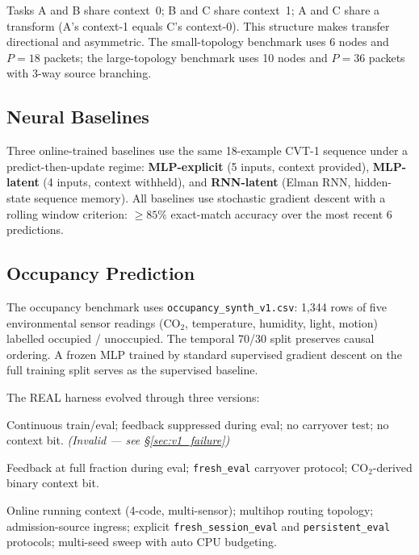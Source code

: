 \documentclass[10pt,twocolumn]{article}
\begin{document}
Tasks A and B share context~0; B and C share context~1; A and C share a
transform (A's context-1 equals C's context-0).
This structure makes transfer directional and asymmetric.
The small-topology benchmark uses 6 nodes and $P=18$ packets;
the large-topology benchmark uses 10 nodes and $P=36$ packets
with 3-way source branching.

\subsection{Neural Baselines}

Three online-trained baselines use the same 18-example CVT-1 sequence
under a predict-then-update regime:
\textbf{MLP-explicit} (5 inputs, context provided),
\textbf{MLP-latent} (4 inputs, context withheld), and
\textbf{RNN-latent} (Elman RNN, hidden-state sequence memory).
All baselines use stochastic gradient descent with a rolling window
criterion: $\geq\!85\%$ exact-match accuracy over the most recent 6 predictions.

\subsection{Occupancy Prediction}
\label{sec:occ_design}

The occupancy benchmark uses \texttt{occupancy\_synth\_v1.csv}: 1,344 rows
of five environmental sensor readings (CO$_2$, temperature, humidity, light,
motion) labelled occupied / unoccupied.
The temporal 70/30 split preserves causal ordering.
A frozen MLP trained by standard supervised gradient descent on the full
training split serves as the supervised baseline.

The REAL harness evolved through three versions:

\begin{description}[leftmargin=1.2em, topsep=2pt]
  \item[V1] Continuous train/eval; feedback suppressed during eval;
            no carryover test; no context bit. \emph{(Invalid --- see \S\ref{sec:v1_failure})}
  \item[V2] Feedback at full fraction during eval; \texttt{fresh\_eval}
            carryover protocol; CO$_2$-derived binary context bit.
  \item[V3] Online running context (4-code, multi-sensor);
            multihop routing topology; admission-source ingress;
            explicit \texttt{fresh\_session\_eval} and \texttt{persistent\_eval}
            protocols; multi-seed sweep with auto CPU budgeting.
\end{description}
\end{document}
